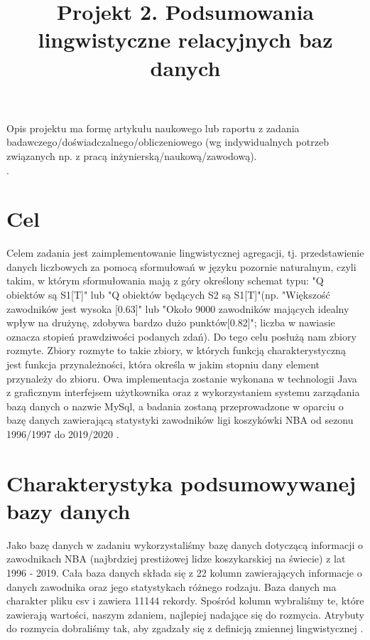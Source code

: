 \documentclass{classrep}
\author{
  \studentinfo{Hubert Gawłowski}{224298} \and
  \studentinfo{Kamil Kiszko-Zgierski}{224328} }
\title{Projekt 2.  Podsumowania lingwistyczne relacyjnych baz danych}
\begin{document}
\maketitle

Opis projektu ma formę artykułu naukowego lub raportu z zadania
badawczego/doświadczalnego/obliczeniowego (wg indywidualnych potrzeb związanych np. z
pracą inżynierską/naukową/zawodową). \\
. 

\section{Cel}
Celem zadania jest zaimplementowanie lingwistycznej agregacji, tj. przedstawienie danych liczbowych za pomocą sformułowań w języku pozornie naturalnym, czyli takim, w którym sformułowania mają z góry określony schemat typu: "Q obiektów są S1[T]" lub "Q obiektów będących S2 są S1[T]"\cite{niewiadomski08}(np. "Większość zawodników jest wysoka [0.63]" lub "Około 9000 zawodników mających idealny wpływ na drużynę, zdobywa bardzo dużo punktów[0.82]"; liczba w nawiasie oznacza stopień prawdziwości podanych zdań). Do tego celu posłużą nam zbiory rozmyte. Zbiory rozmyte to takie zbiory, w których funkcją charakterystyczną jest funkcja przynależności, która określa w jakim stopniu dany element przynależy do zbioru. Owa implementacja zostanie wykonana w technologii Java z graficznym interfejsem użytkownika oraz z wykorzystaniem systemu zarządania bazą danych o nazwie MySql, a badania zostaną przeprowadzone w oparciu o bazę danych zawierającą statystyki zawodników ligi koszykówki NBA od sezonu 1996/1997 do 2019/2020 \cite{nba_data}.  \\


\section{Charakterystyka podsumowywanej bazy danych}

Jako bazę danych w zadaniu wykorzystaliśmy bazę danych dotyczącą informacji o zawodnikach NBA (najbrdziej prestiżowej lidze koszykarskiej na świecie) z lat 1996 - 2019. Cała baza danych składa się z 22 kolumn zawierających informacje o danych zawodnika oraz jego statystykach różnego rodzaju. Baza danych ma charakter pliku csv i zawiera 11144 rekordy. Spośród kolumn wybraliśmy te, które zawierają wartości, naszym zdaniem, najlepiej nadające się do rozmycia. Atrybuty do rozmycia dobraliśmy tak, aby zgadzały się z definicją zmiennej lingwistycznej \cite{niewiadomski19}. \\
\end{document}
